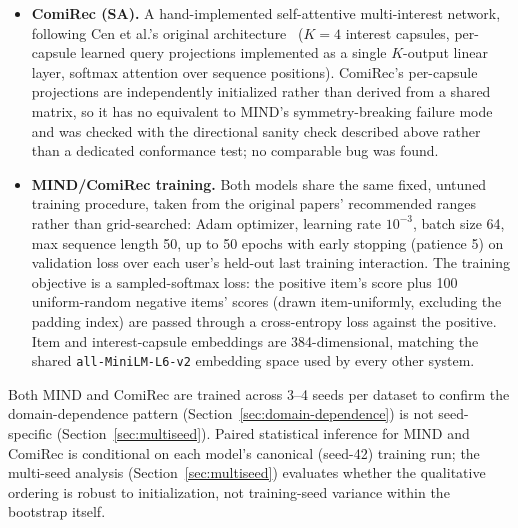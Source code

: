 \documentclass[11pt,a4paper]{article}
\begin{document}
\begin{itemize}[leftmargin=*, itemsep=3pt]
        across capsules, guaranteed every capsule updated identically,
        silently collapsing the model's effective interest count to 1
        regardless of the nominal $K$. The test
        (\texttt{test\_mind\_\allowbreak routing.py}) caught this before
        any number reported here was generated; catching a real,
        non-obvious bug is the evidence the verification method works, not
        just a disclosed limitation.
  \item \textbf{ComiRec (SA).} A hand-implemented self-attentive
        multi-interest network, following Cen et al.'s original
        architecture~\cite{cen2020} ($K=4$ interest capsules, per-capsule
        learned query projections implemented as a single $K$-output
        linear layer, softmax attention over sequence positions). ComiRec's
        per-capsule projections are independently initialized rather than
        derived from a shared matrix, so it has no equivalent to MIND's
        symmetry-breaking failure mode and was checked with the directional
        sanity check described above rather than a dedicated conformance
        test; no comparable bug was found.
  \item \textbf{MIND/ComiRec training.} Both models share the same fixed,
        untuned training procedure, taken from the original papers'
        recommended ranges rather than grid-searched: Adam optimizer,
        learning rate $10^{-3}$, batch size 64, max sequence length 50, up
        to 50 epochs with early stopping (patience 5) on validation loss
        over each user's held-out last training interaction. The training
        objective is a sampled-softmax loss: the positive item's score plus
        100 uniform-random negative items' scores (drawn item-uniformly,
        excluding the padding index) are passed through a cross-entropy
        loss against the positive. Item and interest-capsule embeddings are
        384-dimensional, matching the shared \texttt{all-\allowbreak MiniLM-\allowbreak L6-\allowbreak v2}
        embedding space used by every other system.
\end{itemize}

Both MIND and ComiRec are trained across 3--4 seeds per dataset to confirm
the domain-dependence pattern (Section~\ref{sec:domain-dependence}) is not
seed-specific (Section~\ref{sec:multiseed}). Paired statistical inference
for MIND and ComiRec is conditional on each model's canonical (seed-42)
training run; the multi-seed analysis (Section~\ref{sec:multiseed})
evaluates whether the qualitative ordering is robust to initialization,
not training-seed variance within the bootstrap itself.
\end{document}
